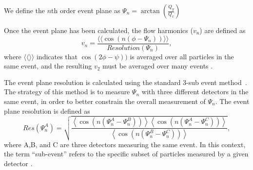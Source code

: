 We define the $n$th order event plane as
$\Psi_n = \arctan \left( \frac{Q_y}{Q_x} \right) $

Once the event plane has been calculated, the flow harmonics ($v_n$) are defined as
\begin{equation}
v_n = \frac{\langle \langle\cos(n(\phi - \Psi_n))\rangle \rangle}{Resolution(\Psi_n)},
\end{equation}
where $\langle \langle \rangle \rangle$ indicates that $\cos(2\phi-\psi))$ is averaged over all particles in the same event, and the resulting $v_2$ must be averaged over many events \cite{PhysRevC.58.1671}. 

The event plane resolution is calculated using the standard 3-sub event method~\cite{PhysRevC.58.1671}. The strategy of this method is to measure $\Psi_n$ with three
different detectors in the same event, in order to better constrain the overall measurement of $\Psi_n$. The event plane resolution is defined as
\begin{equation}
Res(\Psi_n^A) = \sqrt{\frac{\left<\cos(n(\Psi_n^A - \Psi_n^B))\right>\left<\cos(n(\Psi_n^A - \Psi_n^C))\right>}{\left<\cos(n(\Psi_n^B - \Psi_n^C))\right>}},
\label{eqn:res}
\end{equation}
where A,B, and C are three detectors measuring the same event. In this context, the term ``sub-event'' refers to the specific subset of particles measured by a given detector \cite{Voloshin1996}.




